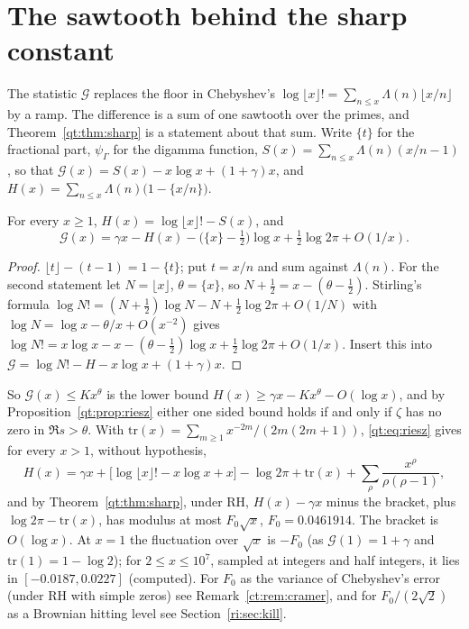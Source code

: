 \section{The sawtooth behind the sharp constant}\label{sw:sec:saw}

The statistic $\mathcal G$ replaces the floor in Chebyshev's $\log\lfloor x\rfloor!=\sum_{n\le x}\Lambda(n)\lfloor x/n\rfloor$ by a ramp. The difference is a sum of one sawtooth over the primes, and Theorem~\ref{qt:thm:sharp} is a statement about that sum. Write $\{t\}$ for the fractional part, $\psi_\Gamma$ for the digamma function, $S(x)=\sum_{n\le x}\Lambda(n)(x/n-1)$, so that $\mathcal G(x)=S(x)-x\log x+(1+\gamma)x$, and $H(x)=\sum_{n\le x}\Lambda(n)\bigl(1-\{x/n\}\bigr)$.

\begin{proposition}\label{sw:prop:floor}
For every $x\ge1$, $H(x)=\log\lfloor x\rfloor!-S(x)$, and
\[
\mathcal G(x)=\gamma x-H(x)-\bigl(\{x\}-\tfrac12\bigr)\log x+\tfrac12\log2\pi+O(1/x).
\]
\end{proposition}

\begin{proof}
$\lfloor t\rfloor-(t-1)=1-\{t\}$; put $t=x/n$ and sum against $\Lambda(n)$. For the second statement let $N=\lfloor x\rfloor$, $\theta=\{x\}$, so $N+\tfrac12=x-(\theta-\tfrac12)$. Stirling's formula $\log N!=(N+\tfrac12)\log N-N+\tfrac12\log2\pi+O(1/N)$ with $\log N=\log x-\theta/x+O(x^{-2})$ gives $\log N!=x\log x-x-(\theta-\tfrac12)\log x+\tfrac12\log2\pi+O(1/x)$. Insert this into $\mathcal G=\log N!-H-x\log x+(1+\gamma)x$.
\end{proof}

So $\mathcal G(x)\le Kx^\theta$ is the lower bound $H(x)\ge\gamma x-Kx^\theta-O(\log x)$, and by Proposition~\ref{qt:prop:riesz} either one sided bound holds if and only if $\zeta$ has no zero in $\Re s>\theta$. With $\mathrm{tr}(x)=\sum_{m\ge1}x^{-2m}/(2m(2m+1))$, \eqref{qt:eq:riesz} gives for every $x>1$, without hypothesis,
\[
H(x)=\gamma x+\bigl[\log\lfloor x\rfloor!-x\log x+x\bigr]-\log2\pi+\mathrm{tr}(x)+\sum_\rho\frac{x^\rho}{\rho(\rho-1)},
\]
and by Theorem~\ref{qt:thm:sharp}, under RH, $H(x)-\gamma x$ minus the bracket, plus $\log2\pi-\mathrm{tr}(x)$, has modulus at most $F_0\sqrt x$, $F_0=0.0461914$. The bracket is $O(\log x)$. At $x=1$ the fluctuation over $\sqrt x$ is $-F_0$ (as $\mathcal G(1)=1+\gamma$ and $\mathrm{tr}(1)=1-\log2$); for $2\le x\le10^7$, sampled at integers and half integers, it lies in $[-0.0187,0.0227]$ (computed). For $F_0$ as the variance of Chebyshev's error (under RH with simple zeros) see Remark~\ref{ct:rem:cramer}, and for $F_0/(2\sqrt2)$ as a Brownian hitting level see Section~\ref{ri:sec:kill}.

